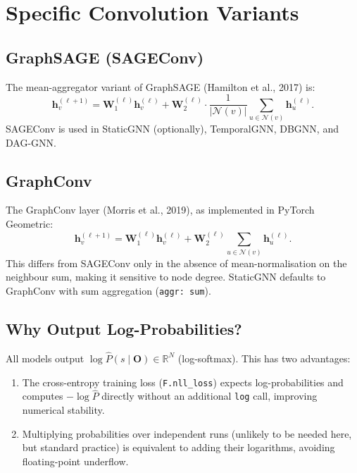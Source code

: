 \documentclass[12pt,a4paper]{report}
\newcommand{\R}{\mathbb{R}}
\newcommand{\bh}{\mathbf{h}}
\newcommand{\bW}{\mathbf{W}}
\newcommand{\calN}{\mathcal{N}}
\begin{document}
\section{Specific Convolution Variants}

\subsection{GraphSAGE (SAGEConv)}

The mean-aggregator variant of GraphSAGE (Hamilton et al., 2017) is:
\begin{equation}
  \bh_v^{(\ell+1)} = \bW_1^{(\ell)} \bh_v^{(\ell)} + \bW_2^{(\ell)} \cdot \frac{1}{|\calN(v)|} \sum_{u \in \calN(v)} \bh_u^{(\ell)}.
  \label{eq:sage}
\end{equation}
SAGEConv is used in StaticGNN (optionally), TemporalGNN, DBGNN, and DAG-GNN.

\subsection{GraphConv}

The GraphConv layer (Morris et al., 2019), as implemented in PyTorch Geometric:
\begin{equation}
  \bh_v^{(\ell+1)} = \bW_1^{(\ell)} \bh_v^{(\ell)} + \bW_2^{(\ell)} \sum_{u \in \calN(v)} \bh_u^{(\ell)}.
  \label{eq:graphconv}
\end{equation}
This differs from SAGEConv only in the absence of mean-normalisation on the
neighbour sum, making it sensitive to node degree. StaticGNN defaults to
GraphConv with sum aggregation (\texttt{aggr: sum}).

\subsection{Why Output Log-Probabilities?}

All models output $\log \hat{P}(s \mid \mathbf{O}) \in \R^N$ (log-softmax).
This has two advantages:
\begin{enumerate}[noitemsep]
  \item The cross-entropy training loss (\texttt{F.nll\_loss}) expects
    log-probabilities and computes $-\log \hat{P}$ directly without an
    additional \texttt{log} call, improving numerical stability.
  \item Multiplying probabilities over independent runs (unlikely to be
    needed here, but standard practice) is equivalent to adding their
    logarithms, avoiding floating-point underflow.
\end{enumerate}
\end{document}
